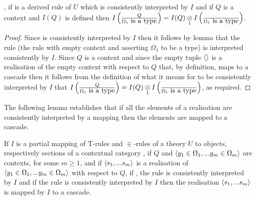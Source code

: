 \begin{lemma}
\IfIpartialmappingUtoC,
if \ZOmega is a derived rule of $U$  which  is consistently interpreted by $I$ 
and if $Q$ is a context and $I(Q)$ is defined 
then $\Imappedrule{Q}{\isT{\Omega_1}}=\crossx{I(Q)}{\Imappedrule{}{\isT{\Omega_1}}}{1}$.
\end{lemma}
\begin{proof}
Since \ZOmega is consistently interpreted by $I$ then it follows by lemma  that the rule 
 (the rule with empty context and asserting $\Omega_1$ to be a type) is interpreted consistently
by $I$. Since $Q$ is a context and since the empty tuple $\tuple{}$ is a realisation of the empty context with respect to $Q$ that, by definition, maps to a cascade then it follows from the definition of what it means for  \gatdisplayrule{}{\isT{\Omega}} to be consistently interpreted by $I$ that
$\Imappedrule{Q}{\isT{\Omega_1}}=\crossx{I(Q)}{\Imappedrule{}{\isT{\Omega_1}}}{1}$, as required.
\end{proof}
The following lemma establishes that if all the elements of a realisation are consistently interpreted by a mapping then the elements are 
mapped to a cascade. 
\begin{lemma}
\newcommand {\forceSOURCEwidth}{\rule{5cm}{0pt}}  %
\newcommand {\forceTARGETwidth}{\rule{2.2cm}{0pt}}
If $I$ is a partial mapping of T-rules and $\in$-rules of a theory $U$ to objects, respectively sections of a contextual category \catc,
 if $Q$  and $\encyOmega{m}$ are contexts, for some $m \geq 1$,  and if $\tuple{\sm}$ is a realisation of $\tuple{\yOmega{m}}$ with respect to $Q$,
 if \foreachj, the rule  is consistently interpreted by $I$ 
 and if the rule  is consistently interpreted by $I$
then the realisation $\tuple{s_1,...s_m}$ is mapped by $I$ to a cascade.
\end{lemma}

